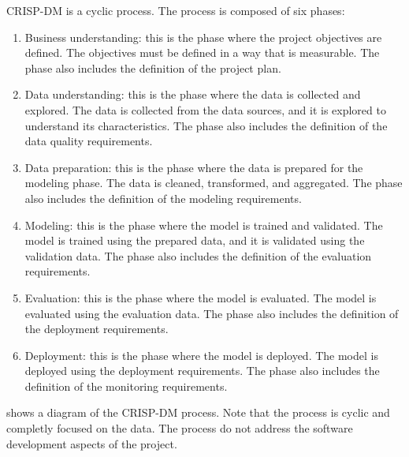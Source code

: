 CRISP-DM is a cyclic process.  The process is composed of six phases:
\begin{enumerate}
  \item Business understanding: this is the phase where the project objectives are
    defined.  The objectives must be defined in a way that is measurable.  The phase also
    includes the definition of the project plan.
  \item Data understanding: this is the phase where the data is collected and explored.
    The data is collected from the data sources, and it is explored to understand its
    characteristics.  The phase also includes the definition of the data quality
    requirements.
  \item Data preparation: this is the phase where the data is prepared for the modeling
    phase.  The data is cleaned, transformed, and aggregated.  The phase also includes the
    definition of the modeling requirements.
  \item Modeling: this is the phase where the model is trained and validated.  The model is
    trained using the prepared data, and it is validated using the validation data.  The
    phase also includes the definition of the evaluation requirements.
  \item Evaluation: this is the phase where the model is evaluated.  The model is evaluated
    using the evaluation data.  The phase also includes the definition of the deployment
    requirements.
  \item Deployment: this is the phase where the model is deployed.  The model is deployed
    using the deployment requirements.  The phase also includes the definition of the
    monitoring requirements.
\end{enumerate}

 shows a diagram of the CRISP-DM process.  Note that the process is
cyclic and completly focused on the data.  The process do not address the software
development aspects of the project.

